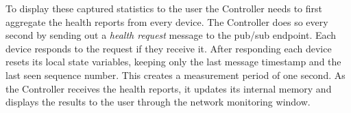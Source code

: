 \documentclass[letterpaper,twocolumn,12pt]{article}
\begin{document}


To display these captured statistics to the user the Controller needs to first aggregate the health reports from every device. The Controller does so every second by sending out a \textit{health request} message to the pub/sub endpoint. Each device responds to the request if they receive it. After responding each device resets its local state variables, keeping only the last message timestamp and the last seen sequence number. This creates a measurement period of one second. As the Controller receives the health reports, it updates its internal memory and displays the results to the user through the network monitoring window.
\end{document}
